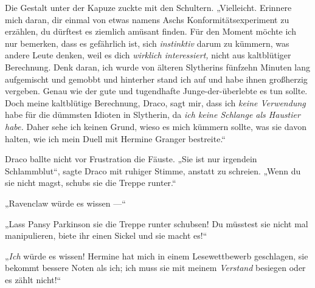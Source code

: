 Die Gestalt unter der Kapuze zuckte mit den Schultern.
„Vielleicht. Erinnere mich daran, dir einmal von etwas namens Aschs Konformitätsexperiment zu erzählen, du dürftest es ziemlich amüsant finden. Für den Moment möchte ich nur bemerken, dass es gefährlich ist, sich \emph{instinktiv} darum zu kümmern, was andere Leute denken, weil es dich \emph{wirklich interessiert,} nicht aus kaltblütiger Berechnung. Denk daran, ich wurde von älteren Slytherins fünfzehn Minuten lang aufgemischt und gemobbt und hinterher stand ich auf und habe ihnen großherzig vergeben. Genau wie der gute und tugendhafte Junge-der-überlebte es tun sollte. Doch meine kaltblütige Berechnung, Draco, sagt mir, dass ich \emph{keine Verwendung} habe für die dümmsten Idioten in Slytherin, da \emph{ich keine Schlange als Haustier habe.} Daher sehe ich keinen Grund, wieso es mich kümmern sollte, was sie davon halten, wie ich mein Duell mit Hermine Granger bestreite.“

Draco ballte nicht vor Frustration die Fäuste.
„Sie ist nur irgendein Schlammblut“, sagte Draco mit ruhiger Stimme, anstatt zu schreien.
„Wenn du sie nicht magst, schubs sie die Treppe runter.“

„Ravenclaw würde es wissen —“

„Lass Pansy Parkinson sie die Treppe runter schubsen! Du müsstest sie nicht mal manipulieren, biete ihr einen Sickel und sie macht es!“

„\emph{Ich} würde es wissen! Hermine hat mich in einem Lesewettbewerb geschlagen, sie bekommt bessere Noten als ich; ich muss sie mit meinem \emph{Verstand} besiegen oder es zählt nicht!“

